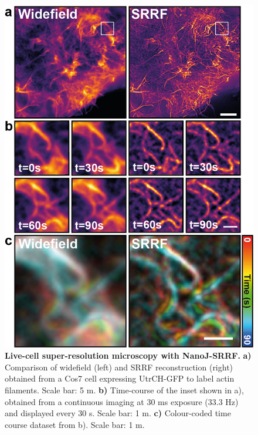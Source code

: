  \begin{figure}[!t]
    \centering
    \includegraphics{Figures/FigureSRRF_v6.png}
    \caption{\textbf{Live-cell super-resolution microscopy with NanoJ-SRRF.} \textbf{a)} Comparison of widefield (left) and SRRF reconstruction (right) obtained from a Cos7 cell expressing UtrCH-GFP to label actin filaments. Scale bar: 5 \micro m. \textbf{b)} Time-course of the inset shown in a), obtained from  a continuous imaging at 30 ms exposure (33.3 Hz) and displayed every 30 s. Scale bar: 1 \micro m. \textbf{c)} Colour-coded time course dataset from b). Scale bar: 1 \micro m.}
    \label{fig:SRRF}
 \end{figure}
 
